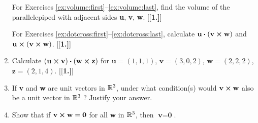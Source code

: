 \begin{enumerate}[\bfseries 1.]
\par\noindent For Exercises \ref{ex:volume:first}--\ref{ex:volume:last}, find the volume of the parallelepiped with adjacent sides \textbf{u},
\textbf{v}, \textbf{w}.
[{[\bfseries 1.]}]
\par\noindent For Exercises \ref{ex:dotcross:first}--\ref{ex:dotcross:last}, calculate $\textbf{u} \bm{\cdot} (\textbf{v} \bm{\times} \textbf{w})$ and
$\textbf{u} \bm{\times} (\textbf{v} \bm{\times} \textbf{w})$.
[{[\bfseries 1.]}]
 \item Calculate $(\textbf{u} \bm{\times} \textbf{v}) \bm{\cdot} (\textbf{w} \bm{\times} \textbf{z})$ for
 $\textbf{u} = (1,1,1)$, $\textbf{v} = (3,0,2)$, $\textbf{w} = (2,2,2)$, $\textbf{z} = (2,1,4)$.
[{[\bfseries 1.]}]
 \item If \textbf{v} and \textbf{w} are unit vectors in $\mathbb{R}^{3}$, under what condition(s) would
  $\textbf{v} \bm{\times} \textbf{w}$ also be a unit vector in $\mathbb{R}^{3}\;$? Justify your answer.
 \item Show that if $\textbf{v} \bm{\times} \textbf{w} = \textbf{0}$ for all \textbf{w} in $\mathbb{R}^{3}$, then
  $\textbf{v} = \textbf{0}$.
\end{enumerate}
